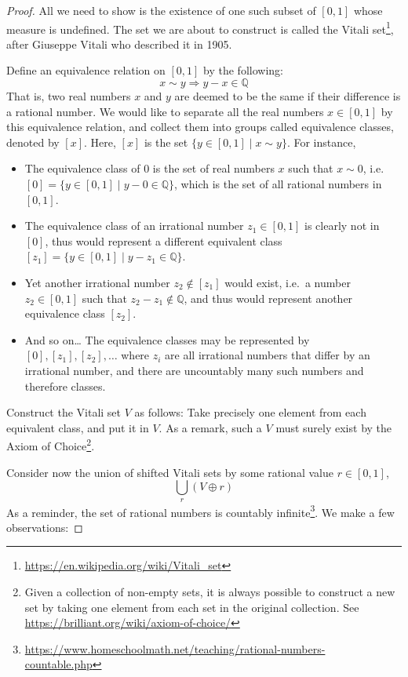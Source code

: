 \documentclass[
]{book}
\newcommand{\bbQ}{\mathbb{Q}}
\theoremstyle{definition}
\theoremstyle{definition}
\theoremstyle{definition}
\theoremstyle{definition}
\theoremstyle{remark}
\begin{document}
\begin{proof}
All we need to show is the existence of one such subset of \([0,1]\) whose measure is undefined. The set we are about to construct is called the Vitali set\footnote{\url{https://en.wikipedia.org/wiki/Vitali_set}}, after Giuseppe Vitali who described it in 1905.

Define an equivalence relation on \([0,1]\) by the following:
\[x\sim y \Rightarrow y-x \in \bbQ\]
That is, two real numbers \(x\) and \(y\) are deemed to be the same if their difference is a rational number. We would like to separate all the real numbers \(x\in[0,1]\) by this equivalence relation, and collect them into groups called equivalence classes, denoted by \([x]\). Here, \([x]\) is the set \(\{y \in [0,1] \mid x \sim y\}.\) For instance,

\begin{itemize}
\item
  The equivalence class of \(0\) is the set of real numbers \(x\) such that \(x \sim 0\), i.e.~\([0] = \{y \in [0,1] \mid y-0\in\bbQ \}\), which is the set of all rational numbers in \([0,1]\).
\item
  The equivalence class of an irrational number \(z_1\in[0,1]\) is clearly not in \([0]\), thus would represent a different equivalent class \([z_1]=\{y \in [0,1] \mid y-z_1 \in \bbQ \}\).
\item
  Yet another irrational number \(z_2\not\in [z_1]\) would exist, i.e.~a number \(z_2\in[0,1]\) such that \(z_2-z_1 \not\in\bbQ\), and thus would represent another equivalence class \([z_2]\).
\item
  And so on\ldots{} The equivalence classes may be represented by \([0],[z_1],[z_2],\dots\) where \(z_i\) are all irrational numbers that differ by an irrational number, and there are uncountably many such numbers and therefore classes.
\end{itemize}

Construct the Vitali set \(V\) as follows: Take precisely one element from each equivalent class, and put it in \(V\). As a remark, such a \(V\) must surely exist by the Axiom of Choice\footnote{Given a collection of non-empty sets, it is always possible to construct a new set by taking one element from each set in the original collection. See \url{https://brilliant.org/wiki/axiom-of-choice/}}.

Consider now the union of shifted Vitali sets by some rational value \(r\in[0,1]\),
\[
\bigcup_{r} (V \oplus r)
\]
As a reminder, the set of rational numbers is countably infinite\footnote{\url{https://www.homeschoolmath.net/teaching/rational-numbers-countable.php}}. We make a few observations:


\end{proof}
\end{document}
